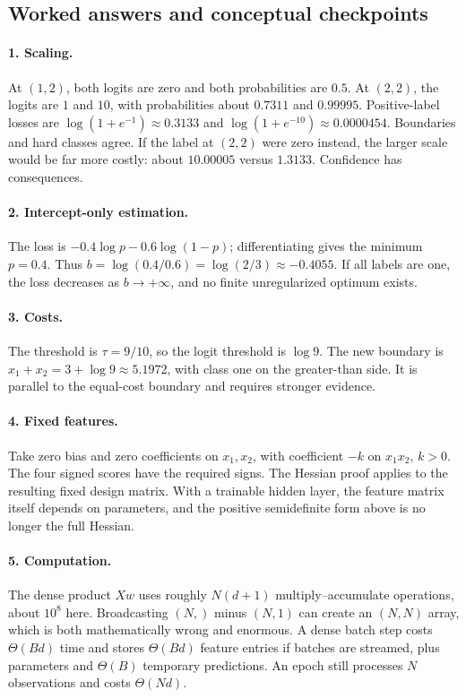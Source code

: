 \subsection{Worked answers and conceptual checkpoints}
\paragraph{1. Scaling.}
At $(1,2)$, both logits are zero and both probabilities are $0.5$. At $(2,2)$,
the logits are $1$ and $10$, with probabilities about $0.7311$ and $0.99995$.
Positive-label losses are $\log(1+e^{-1})\approx0.3133$ and
$\log(1+e^{-10})\approx0.0000454$. Boundaries and hard classes agree. If the
label at $(2,2)$ were zero instead, the larger scale would be far more costly:
about $10.00005$ versus $1.3133$. Confidence has consequences.

\paragraph{2. Intercept-only estimation.}
The loss is $-0.4\log p-0.6\log(1-p)$; differentiating gives the minimum
$p=0.4$. Thus $b=\log(0.4/0.6)=\log(2/3)\approx-0.4055$. If all labels are one,
the loss decreases as $b\to+\infty$, and no finite unregularized optimum exists.

\paragraph{3. Costs.}
The threshold is $\tau=9/10$, so the logit threshold is $\log9$. The new boundary
is $x_1+x_2=3+\log9\approx5.1972$, with class one on the greater-than side.
It is parallel to the equal-cost boundary and requires stronger evidence.

\paragraph{4. Fixed features.}
Take zero bias and zero coefficients on $x_1,x_2$, with coefficient $-k$ on
$x_1x_2$, $k>0$. The four signed scores have the required signs. The Hessian
proof applies to the resulting fixed design matrix. With a trainable hidden
layer, the feature matrix itself depends on parameters, and the positive
semidefinite form above is no longer the full Hessian.

\paragraph{5. Computation.}
The dense product $Xw$ uses roughly $N(d+1)$ multiply--accumulate operations,
about $10^8$ here. Broadcasting $(N,)$ minus $(N,1)$ can create an $(N,N)$ array,
which is both mathematically wrong and enormous. A dense batch step costs
$\Theta(Bd)$ time and stores $\Theta(Bd)$ feature entries if batches are streamed,
plus parameters and $\Theta(B)$ temporary predictions. An epoch still processes
$N$ observations and costs $\Theta(Nd)$.


